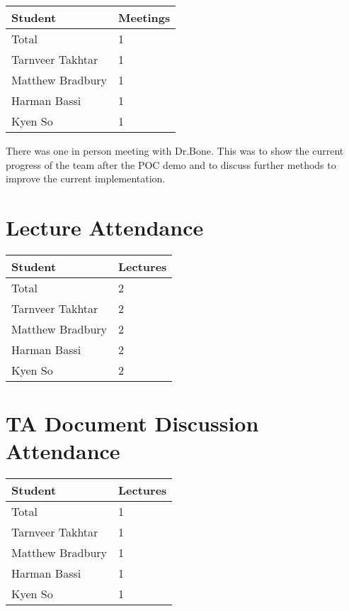 \documentclass{article}
\begin{document}
\begin{table}[H]
\centering
\begin{tabular}{ll}
\toprule
\textbf{Student} & \textbf{Meetings}\\
\midrule
Total & 1\\
Tarnveer Takhtar & 1\\
Matthew Bradbury & 1\\
Harman Bassi & 1\\
Kyen So & 1\\
\bottomrule
\end{tabular}
\end{table}

There was one in person meeting with Dr.Bone. 
This was to show the current progress of the team after the POC demo and to discuss 
further methods to improve the current implementation.

\section{Lecture Attendance}

\begin{table}[H]
\centering
\begin{tabular}{ll}
\toprule
\textbf{Student} & \textbf{Lectures}\\
\midrule
Total & 2\\
Tarnveer Takhtar & 2\\
Matthew Bradbury & 2\\
Harman Bassi & 2\\
Kyen So & 2\\
\bottomrule
\end{tabular}
\end{table}

\section{TA Document Discussion Attendance}


\begin{table}[H]
\centering
\begin{tabular}{ll}
\toprule
\textbf{Student} & \textbf{Lectures}\\
\midrule
Total & 1\\
Tarnveer Takhtar & 1\\
Matthew Bradbury & 1\\
Harman Bassi & 1\\
Kyen So & 1\\
\bottomrule
\end{tabular}
\end{table}
\end{document}
